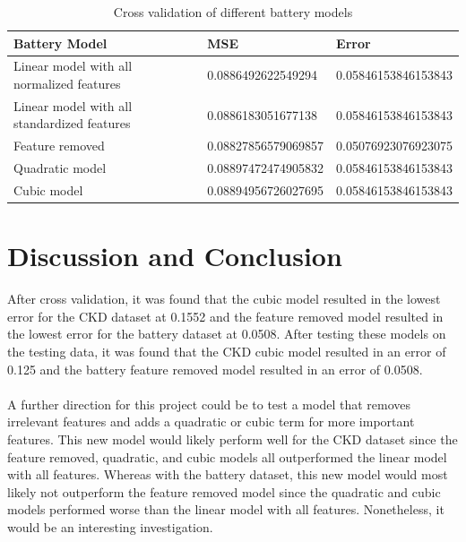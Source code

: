 \documentclass{article}
\begin{document}
\begin{table}[h!]
  \centering
  \caption{Cross validation of different battery models}
  \begin{tabular}{|l|l|l|}
  \hline
  \textbf{Battery Model}                            & \textbf{MSE}                  & \textbf{Error}               \\ \hline
  Linear model with all normalized features         & 0.0886492622549294            & 0.05846153846153843          \\ \hline
  Linear model with all standardized features       & 0.0886183051677138            & 0.05846153846153843          \\ \hline
  Feature removed                                   & 0.08827856579069857           & 0.05076923076923075           \\ \hline
  Quadratic model                                   & 0.08897472474905832           & 0.05846153846153843          \\ \hline
  Cubic model                                       & 0.08894956726027695           & 0.05846153846153843          \\ \hline
  \end{tabular}
\end{table}

\section{Discussion and Conclusion}

After cross validation, it was found that the cubic model resulted in the lowest error for the CKD dataset at 0.1552 and the feature removed model resulted in the lowest error for the battery dataset at 0.0508.  After testing these models on the testing data, it was found that the CKD cubic model resulted in an error of 0.125 and the battery feature removed model resulted in an error of 0.0508. 
\\
\\
A further direction for this project could be to test a model that removes irrelevant features and adds a quadratic or cubic term for more important features.  This new model would likely perform well for the CKD dataset since the feature removed, quadratic, and cubic models all outperformed the linear model with all features.  Whereas with the battery dataset, this new model would most likely not outperform the feature removed model since the quadratic and cubic models performed worse than the linear model with all features.  Nonetheless, it would be an interesting investigation. 
\end{document}
